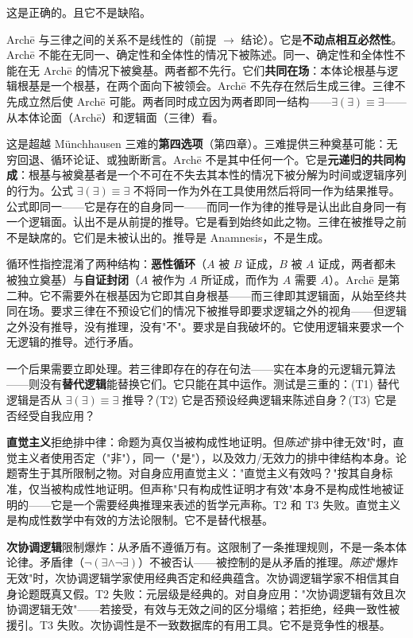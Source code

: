 \documentclass[10pt, openany, oneside]{book}
\begin{document}
这是正确的。且它不是缺陷。

Arch\={e} 与三律之间的关系不是线性的（前提 $\to$ 结论）。它是\textbf{不动点相互必然性}。Arch\={e} 不能在无同一、确定性和全体性的情况下被陈述。同一、确定性和全体性不能在无 Arch\={e} 的情况下被奠基。两者都不先行。它们\textbf{共同在场}：本体论根基与逻辑根基是一个根基，在两个面向下被领会。Arch\={e} 不先存在然后生成三律。三律不先成立然后使 Arch\={e} 可能。两者同时成立因为两者即同一结构——$\exists(\exists) \equiv \exists$——从本体论面（Arch\={e}）和逻辑面（三律）看。

这是超越 M\"{u}nchhausen 三难的\textbf{第四选项}（第四章）。三难提供三种奠基可能：无穷回退、循环论证、或独断断言。Arch\={e} 不是其中任何一个。它是\textbf{元递归的共同构成}：根基与被奠基者是一个不可在不失去其本性的情况下被分解为时间或逻辑序列的行为。公式 $\exists(\exists) \equiv \exists$ 不将同一作为外在工具使用然后将同一作为结果推导。公式即同一——它是存在的自身同一——而同一作为律的推导是认出此自身同一有一个逻辑面。认出不是从前提的推导。它是看到始终如此之物。三律在被推导之前不是缺席的。它们是未被认出的。推导是 Anamnesis，不是生成。

循环性指控混淆了两种结构：\textbf{恶性循环}（$A$ 被 $B$ 证成，$B$ 被 $A$ 证成，两者都未被独立奠基）与\textbf{自证封闭}（$A$ 被作为 $A$ 所证成，而作为 $A$ 需要 $A$）。Arch\={e} 是第二种。它不需要外在根基因为它即其自身根基——而三律即其逻辑面，从始至终共同在场。要求三律在不预设它们的情况下被推导即要求逻辑之外的视角——但逻辑之外没有推导，没有推理，没有"不"。要求是自我破坏的。它使用逻辑来要求一个无逻辑的推导。述行矛盾。

一个后果需要立即处理。若三律即存在的存在句法——实在本身的元逻辑元算法——则没有\textbf{替代逻辑}能替换它们。它只能在其中运作。测试是三重的：(T1) 替代逻辑是否从 $\exists(\exists) \equiv \exists$ 推导？(T2) 它是否预设经典逻辑来陈述自身？(T3) 它是否经受自我应用？

\vspace{0.5em}

\textbf{直觉主义}拒绝排中律：命题为真仅当被构成性地证明。但\textit{陈述}"排中律无效"时，直觉主义者使用否定（"非"），同一（"是"），以及效力/无效力的排中律结构本身。论题寄生于其所限制之物。对自身应用直觉主义："直觉主义有效吗？"按其自身标准，仅当被构成性地证明。但声称"只有构成性证明才有效"本身不是构成性地被证明的——它是一个需要经典推理来表述的哲学元声称。T2 和 T3 失败。直觉主义是构成性数学中有效的方法论限制。它不是替代根基。

\textbf{次协调逻辑}限制爆炸：从矛盾不遵循万有。这限制了一条推理规则，不是一条本体论律。矛盾律（$\neg(\exists \wedge \neg\exists)$）不被否认——被控制的是从矛盾的推理。\textit{陈述}"爆炸无效"时，次协调逻辑学家使用经典否定和经典蕴含。次协调逻辑学家不相信其自身论题既真又假。T2 失败：元层级是经典的。对自身应用："次协调逻辑有效且次协调逻辑无效"——若接受，有效与无效之间的区分塌缩；若拒绝，经典一致性被援引。T3 失败。次协调性是不一致数据库的有用工具。它不是竞争性的根基。
\end{document}
